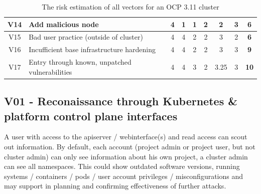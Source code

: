 \begin{landscape}
\begin{table}[]
{\begin{tabular}{|c|l|cccc|cc|c|}
V14             & Add malicious node                                                                     & 4                                        & 1                              & 1                                        & 2                    & 2                                      & 3            & \textbf{6}           \\ \hline
V15             & Bad user practice (outside of cluster)                                                 & 4                                        & 4                              & 2                                        & 2                    & 3                                      & 2            & \textbf{6}           \\ \hline
V16             & Incufficient base infrastructure hardening                                             & 4                                        & 4                              & 2                                        & 2                    & 3                                      & 3            & \textbf{9}           \\ \hline
V17             & Entry through known, unpatched vulnerabilities                                         & 4                                        & 4                              & 3                                        & 2                    & 3.25                                   & 3            & \textbf{10}          \\ \hline
\end{tabular}%
}
\caption{The risk estimation of all vectors for an OCP 3.11 cluster}
\label{tab:aksRiskTable}
\end{table}
\end{landscape}

\subsection{V01 - Reconaissance through Kubernetes \& platform control plane interfaces}

A user with access to the apiserver / webinterface(s) and read access can scout out information.
By default, each account (project admin or project user, but not cluster admin) can only see information about his own project, a cluster admin can see all namespaces.
This could show outdated software versions, running systems / containers / pods / user account privileges / misconfigurations and may support in planning and confirming effectiveness of further attacks.

